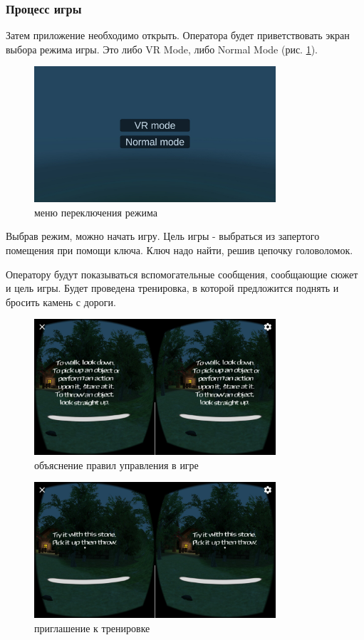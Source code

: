 \subsubsection{Процесс игры}
Затем приложение необходимо открыть. Оператора будет приветствовать экран выбора режима игры. Это либо VR Mode, либо Normal Mode (рис. \ref{modes}).
\begin{figure}[h!]
    \centering
    \includegraphics[width=0.8\textwidth]{./screenshots/modes.jpg}
    \caption{\small{меню переключения режима}}
    \label{modes}
\end{figure}

Выбрав режим, можно начать игру. Цель игры - выбраться из запертого помещения при помощи ключа. Ключ надо найти, решив цепочку головоломок. 

Оператору будут показываться вспомогательные сообщения, сообщающие сюжет и цель игры. Будет проведена тренировка, в которой предложится поднять и бросить камень с дороги. 
\begin{figure}[h!]
    \centering
    \includegraphics[width=0.8\textwidth]{./screenshots/tutorial.jpg}
    \caption{\small{объяснение правил управления в игре}}
    \label{tutorial}
\end{figure} 

\begin{figure}[h!]
    \centering
    \includegraphics[width=0.8\textwidth]{./screenshots/try.jpg}
    \caption{\small{приглашение к тренировке}}
    \label{try}
\end{figure} 

